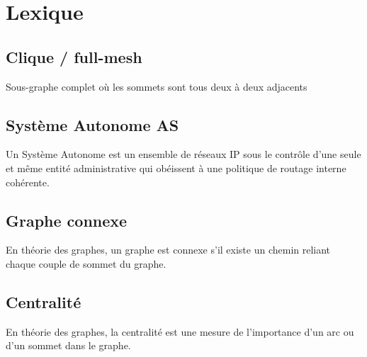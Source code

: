 
% 

\section*{Lexique}

\subsection*{Clique / full-mesh}

Sous-graphe complet o\`u les sommets sont tous deux \`a deux adjacents

\subsection*{Syst\`eme Autonome AS}

Un Syst\`eme Autonome est un ensemble de r\'eseaux IP sous le contrôle d'une seule et m\^eme entit\'e administrative qui ob\'eissent \`a une politique de routage interne coh\'erente.

\subsection*{Graphe connexe}

En th\'eorie des graphes, un graphe est connexe s'il existe un chemin reliant chaque couple de sommet du graphe.

\subsection*{Centralit\'e}

En th\'eorie des graphes, la centralit\'e est une mesure de l'importance d'un arc ou d'un sommet dans le graphe.

% 
